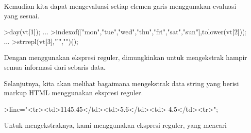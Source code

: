 \documentclass{article}
\begin{document}
\begin{eulernotebook}
\begin{eulercomment}
\begin{eulercomment}
\begin{eulercomment}
\begin{eulercomment}
\begin{eulercomment}
\begin{eulercomment}
\begin{eulercomment}
\begin{eulercomment}
\begin{eulercomment}
\begin{eulercomment}
\begin{eulercomment}
\begin{eulercomment}
\begin{eulercomment}
\begin{eulercomment}
\begin{eulercomment}
Kemudian kita dapat mengevaluasi setiap elemen garis menggunakan
evaluasi yang sesuai.
\end{eulercomment}
\begin{eulerprompt}
>day(vt[1]);  ...
>indexof(["mon","tue","wed","thu","fri","sat","sun"],tolower(vt[2]));  ...
>strrepl(vt[3],"'","")();
\end{eulerprompt}
\begin{eulercomment}
Dengan menggunakan ekspresi reguler, dimungkinkan untuk mengekstrak
hampir semua informasi dari sebaris data.

Selanjutnya, kita akan melihat bagaimana mengekstrak data string yang
berisi markup HTML menggunakan ekspresi reguler.
\end{eulercomment}
\begin{eulerprompt}
>line="<tr><td>1145.45</td><td>5.6</td><td>-4.5</td><tr>";
\end{eulerprompt}
\begin{eulercomment}
Untuk mengekstraknya, kami menggunakan ekspresi reguler, yang mencari


\end{eulercomment}
\end{eulercomment}
\end{eulercomment}
\end{eulercomment}
\end{eulercomment}
\end{eulercomment}
\end{eulercomment}
\end{eulercomment}
\end{eulercomment}
\end{eulercomment}
\end{eulercomment}
\end{eulercomment}
\end{eulercomment}
\end{eulercomment}
\end{eulercomment}
\end{eulernotebook}
\end{document}
